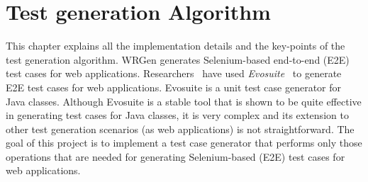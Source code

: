 \chapter{Test generation Algorithm}\label{ch:testGenAlg}

This chapter explains all the implementation details and the key-points of the test generation algorithm. WRGen generates Selenium-based end-to-end (E2E) test cases for web applications. Researchers~\cite{biagiola2017search} have used \textit{Evosuite}~\cite{evosuite} to generate E2E test cases for web applications. Evosuite is a unit test case generator for Java classes. Although Evosuite is a stable tool that is shown to be quite effective in generating test cases for Java classes, it is very complex and its extension to other test generation scenarios (as web applications) is not straightforward. The goal of this project is to implement a test case generator that performs only those operations that are needed for generating Selenium-based (E2E) test cases for web applications.





\newpage